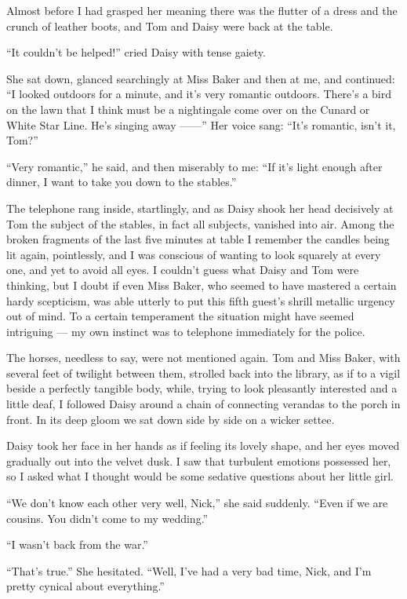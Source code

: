 \documentclass{znotebook}
\begin{document}
Almost before I had grasped her meaning there was the flutter of a dress and the crunch of leather boots, and Tom and Daisy were back at the table.

``It couldn’t be helped!'' cried Daisy with tense gaiety.

She sat down, glanced searchingly at Miss Baker and then at me, and continued: ``I looked outdoors for a minute, and it’s very romantic outdoors. There’s a bird on the lawn that I think must be a nightingale come over on the Cunard or White Star Line. He’s singing away ——'' Her voice sang: ``It’s romantic, isn’t it, Tom?''

``Very romantic,'' he said, and then miserably to me: ``If it’s light enough after dinner, I want to take you down to the stables.''

The telephone rang inside, startlingly, and as Daisy shook her head decisively at Tom the subject of the stables, in fact all subjects, vanished into air. Among the broken fragments of the last five minutes at table I remember the candles being lit again, pointlessly, and I was conscious of wanting to look squarely at every one, and yet to avoid all eyes. I couldn’t guess what Daisy and Tom were thinking, but I doubt if even Miss Baker, who seemed to have mastered a certain hardy scepticism, was able utterly to put this fifth guest’s shrill metallic urgency out of mind. To a certain temperament the situation might have seemed intriguing — my own instinct was to telephone immediately for the police.

The horses, needless to say, were not mentioned again. Tom and Miss Baker, with several feet of twilight between them, strolled back into the library, as if to a vigil beside a perfectly tangible body, while, trying to look pleasantly interested and a little deaf, I followed Daisy around a chain of connecting verandas to the porch in front. In its deep gloom we sat down side by side on a wicker settee.

Daisy took her face in her hands as if feeling its lovely shape, and her eyes moved gradually out into the velvet dusk. I saw that turbulent emotions possessed her, so I asked what I thought would be some sedative questions about her little girl.

``We don’t know each other very well, Nick,'' she said suddenly. ``Even if we are cousins. You didn’t come to my wedding.''

``I wasn’t back from the war.''

``That’s true.'' She hesitated. ``Well, I’ve had a very bad time, Nick, and I’m pretty cynical about everything.''
\end{document}

